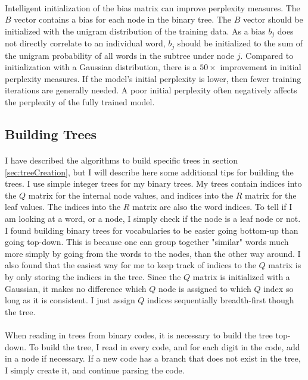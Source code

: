 \paragraph{}
Intelligent initialization of the bias matrix can improve perplexity measures. The $B$ vector contains a bias for each node in the binary tree.  The $B$ vector should be initialized with the unigram distribution of the training data. As a bias $b_j$ does not directly correlate to an individual word, $b_j$ should be initialized to the sum of the unigram probability of all words in the subtree under node $j$.  Compared to initialization with a Gaussian distribution, there is a $50\times$ improvement in initial perplexity measures. If the model's initial perplexity is lower, then fewer training iterations are generally needed. A poor initial perplexity often negatively affects the perplexity of the fully trained model.

\subsection{Building Trees}
\paragraph{}
I have described the algorithms to build specific trees in section \ref{sec:treeCreation}, but I will describe here some additional tips for building the trees. I use simple integer trees for my binary trees. My trees contain indices into the $Q$ matrix for the internal node values, and indices into the $R$ matrix for the leaf values. The indices into the $R$ matrix are also the word indices. To tell if I am looking at a word, or a node, I simply check if the node is a leaf node or not.  I found building binary trees for vocabularies to be easier going bottom-up than going top-down. This is because one can group together "similar" words much more simply by going from the words to the nodes, than the other way around. I also found that the easiest way for me to keep track of indices to the $Q$ matrix is by only storing the indices in the tree. Since the $Q$ matrix is initialized with a Gaussian, it makes no difference which $Q$ node is assigned to which $Q$ index so long as it is consistent. I just assign $Q$ indices sequentially breadth-first though the tree. 
\paragraph{}
When reading in trees from binary codes, it is necessary to build the tree top-down. To build the tree, I read in every code, and for each digit in the code, add in a node if necessary. If a new code has a branch that does not exist in the tree, I simply create it, and continue parsing the code.

